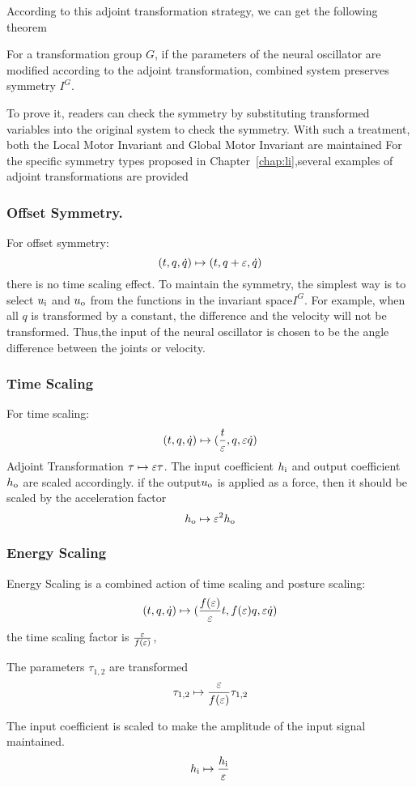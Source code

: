 According to this adjoint transformation strategy, we can get the following theorem
\begin{mythe}
For a transformation group $G$, if the parameters of the neural oscillator are modified according to the adjoint transformation,
combined system preserves symmetry $I^G$.
\end{mythe}
To prove it, readers can check the symmetry by substituting transformed variables into the original system to check the symmetry.
With such a treatment, both the Local Motor Invariant and Global Motor Invariant are maintained
For the specific symmetry types proposed in Chapter~\ref{chap:li},several examples of adjoint transformations are provided


\subsubsection*{ Offset Symmetry.}
For offset symmetry:
\[
(t,q,\dot{q}) \mapsto (t,q+\varepsilon,\dot{q})
\]
there is no time scaling effect.
To maintain the symmetry,  the simplest way is to select $u_{\mathrm{i}}$ and $u_{\mathrm{o}}$ from the functions in the invariant space$I^G$.
For example, when all  $q$ is transformed by a constant, the difference and the velocity will not be transformed. 
Thus,the input of the neural oscillator is chosen to be the angle difference between the joints or velocity.



\subsubsection*{Time Scaling}
For time scaling:
\[
(t,q,\dot{q}) \mapsto (\frac{t}{\varepsilon},q,\varepsilon \dot{q})
\]
Adjoint Transformation
$\tau \mapsto \varepsilon \tau $.
The input coefficient $h_{\mathrm{i}}$ and output coefficient $h_{\mathrm{o}}$ are scaled accordingly.
if the output$u_{\mathrm{o}}$ is applied as a force, then it should be scaled by the acceleration factor
\[
 h_{\mathrm{o}} \mapsto \varepsilon^2 h_{\mathrm{o}}
\]
\subsubsection*{ Energy Scaling}
Energy Scaling is a combined action of time scaling and posture scaling:
\[
(t,q,\dot{q} ) \mapsto ( \frac{f(\varepsilon)}{\varepsilon}t ,f(\varepsilon)q,\varepsilon\dot{q})
\]
the time scaling factor is $\frac{\varepsilon}{f(\varepsilon)}$, 

The parameters $\tau_{1,2}$ are transformed
\[
\tau_{1,2} \mapsto \frac{\varepsilon}{f(\varepsilon)} \tau_{1,2}
\]

The input coefficient is scaled to make the amplitude of the input signal maintained.
\[
h_{\mathrm{i}} \mapsto \frac{h_{\mathrm{i}}}{\varepsilon}
\]


